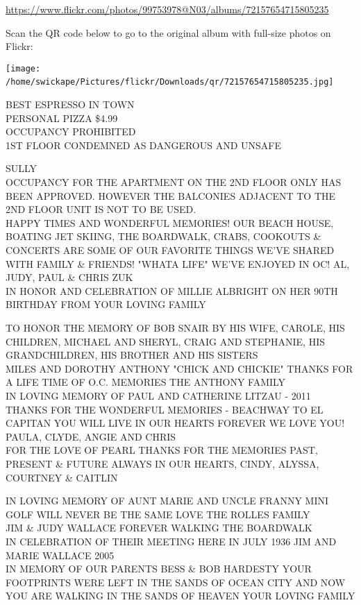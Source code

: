 \documentclass[10pt,letterpaper]{article}
\begin{document}
\url{https://www.flickr.com/photos/99753978@N03/albums/72157654715805235}

Scan the QR code below to go to the original album with full-size photos on Flickr:

\texttt{[image: /home/swickape/Pictures/flickr/Downloads/qr/72157654715805235.jpg]}
\

BEST ESPRESSO IN TOWN\\
PERSONAL PIZZA \$4.99\\
OCCUPANCY PROHIBITED\\
1ST FLOOR CONDEMNED AS DANGEROUS AND UNSAFE

SULLY\\
OCCUPANCY FOR THE APARTMENT ON THE 2ND FLOOR ONLY HAS BEEN APPROVED.  HOWEVER THE BALCONIES ADJACENT TO THE 2ND FLOOR UNIT IS NOT TO BE USED.\\
HAPPY TIMES AND WONDERFUL MEMORIES!  OUR BEACH HOUSE, BOATING JET SKIING, THE BOARDWALK, CRABS, COOKOUTS \& CONCERTS ARE SOME OF OUR FAVORITE THINGS WE'VE SHARED WITH FAMILY \& FRIENDS!  "WHATA LIFE" WE'VE ENJOYED IN OC!  AL, JUDY, PAUL \& CHRIS ZUK\\
IN HONOR AND CELEBRATION OF MILLIE ALBRIGHT ON HER 90TH BIRTHDAY FROM YOUR LOVING FAMILY

TO HONOR THE MEMORY OF BOB SNAIR BY HIS WIFE, CAROLE, HIS CHILDREN, MICHAEL AND SHERYL, CRAIG AND STEPHANIE, HIS GRANDCHILDREN, HIS BROTHER AND HIS SISTERS\\
MILES AND DOROTHY ANTHONY "CHICK AND CHICKIE" THANKS FOR A LIFE TIME OF O.C. MEMORIES THE ANTHONY FAMILY\\
IN LOVING MEMORY OF PAUL AND CATHERINE LITZAU {-} 2011 THANKS FOR THE WONDERFUL MEMORIES {-} BEACHWAY TO EL CAPITAN YOU WILL LIVE IN OUR HEARTS FOREVER WE LOVE YOU!  PAULA, CLYDE, ANGIE AND CHRIS\\
FOR THE LOVE OF PEARL THANKS FOR THE MEMORIES PAST, PRESENT \& FUTURE ALWAYS IN OUR HEARTS, CINDY, ALYSSA, COURTNEY \& CAITLIN

IN LOVING MEMORY OF AUNT MARIE AND UNCLE FRANNY MINI GOLF WILL NEVER BE THE SAME LOVE THE ROLLES FAMILY\\
JIM \& JUDY WALLACE FOREVER WALKING THE BOARDWALK\\
IN CELEBRATION OF THEIR MEETING HERE IN JULY 1936 JIM AND MARIE WALLACE 2005\\
IN MEMORY OF OUR PARENTS BESS \& BOB HARDESTY YOUR FOOTPRINTS WERE LEFT IN THE SANDS OF OCEAN CITY AND NOW YOU ARE WALKING IN THE SANDS OF HEAVEN YOUR LOVING FAMILY
\end{document}
